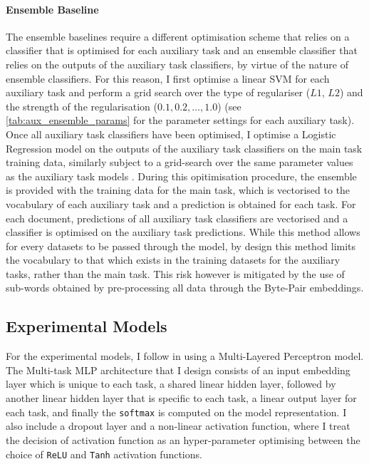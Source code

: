 \paragraph{Ensemble Baseline}
The ensemble baselines require a different optimisation scheme that relies on a classifier that is optimised for each auxiliary task and an ensemble classifier that relies on the outputs of the auxiliary task classifiers, by virtue of the nature of ensemble classifiers.
For this reason, I first optimise a linear SVM for each auxiliary task and perform a grid search over the type of regulariser ({$L1$, $L2$}) and the strength of the regularisation (${0.1, 0.2,\ldots, 1.0}$) (see \cref{tab:aux_ensemble_params} for the parameter settings for each auxiliary task).
Once all auxiliary task classifiers have been optimised, I optimise a Logistic Regression model on the outputs of the auxiliary task classifiers on the main task training data, similarly subject to a grid-search over the same parameter values as the auxiliary task models
.
During this opitimisation procedure, the ensemble is provided with the training data for the main task, which is vectorised to the vocabulary of each auxiliary task and a prediction is obtained for each task.
For each document, predictions of all auxiliary task classifiers are vectorised and a classifier is optimised on the auxiliary task predictions.
While this method allows for every datasets to be passed through the model, by design this method limits the vocabulary to that which exists in the training datasets for the auxiliary tasks, rather than the main task.
This risk however is mitigated by the use of sub-words obtained by pre-processing all data through the Byte-Pair embeddings.

\subsection{Experimental Models}
For the experimental models, I follow \citet{Waseem:2018} in using a Multi-Layered Perceptron model.
The Multi-task MLP architecture that I design consists of an input embedding layer which is unique to each task, a shared linear hidden layer, followed by another linear hidden layer that is specific to each task, a linear output layer for each task, and finally the \texttt{softmax} is computed on the model representation.
I also include a dropout layer and a non-linear activation function, where I treat the decision of activation function as an hyper-parameter optimising between the choice of \texttt{ReLU} and \texttt{Tanh} activation functions.

